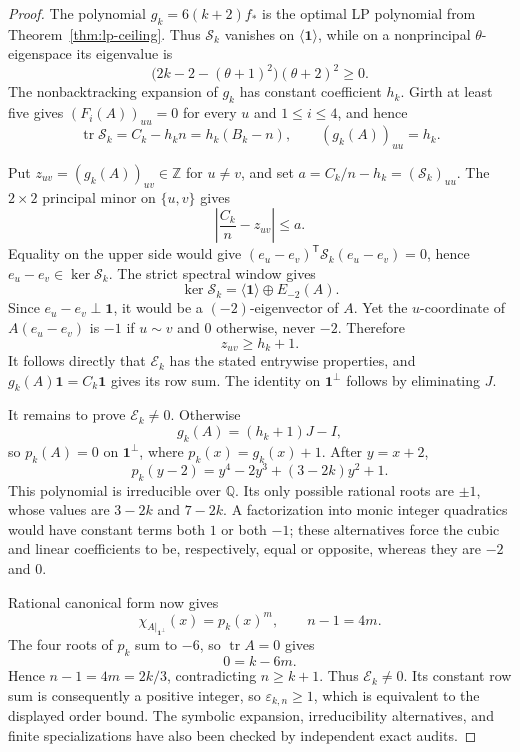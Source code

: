 \documentclass[a4paper,10pt,reqno]{amsart}
\theoremstyle{plain}
\theoremstyle{definition}
\theoremstyle{remark}
\newcommand{\one}{\mathbf 1}
\newcommand{\tr}{\operatorname{tr}}
\begin{document}
\begin{proof}
The polynomial \(g_k=6(k+2)f_*\) is the optimal LP polynomial from
Theorem~\ref{thm:lp-ceiling}.  Thus \(\mathcal S_k\) vanishes on
\(\langle\one\rangle\), while on a nonprincipal \(\theta\)-eigenspace its
eigenvalue is
\[
 \bigl(2k-2-(\theta+1)^2\bigr)(\theta+2)^2\ge0.
\]
The nonbacktracking expansion of \(g_k\) has constant coefficient \(h_k\).
Girth at least five gives
\((F_i(A))_{uu}=0\) for every \(u\) and \(1\le i\le4\), and hence
\[
 \tr\mathcal S_k=C_k-h_kn=h_k(B_k-n),
 \qquad (g_k(A))_{uu}=h_k.
\]

Put \(z_{uv}=(g_k(A))_{uv}\in\mathbb Z\) for \(u\ne v\), and set
\(a=C_k/n-h_k=(\mathcal S_k)_{uu}\).  The \(2\times2\) principal minor on
\(\{u,v\}\) gives
\[
 \left|\frac{C_k}{n}-z_{uv}\right|\le a.
\]
Equality on the upper side would give
\((e_u-e_v)^{\mathsf T}\mathcal S_k(e_u-e_v)=0\), hence
\(e_u-e_v\in\ker\mathcal S_k\).  The strict spectral window gives
\[
 \ker\mathcal S_k=\langle\one\rangle\oplus E_{-2}(A).
\]
Since \(e_u-e_v\perp\one\), it would be a \((-2)\)-eigenvector of \(A\).
Yet the \(u\)-coordinate of \(A(e_u-e_v)\) is \(-1\) if \(u\sim v\) and
\(0\) otherwise, never \(-2\).  Therefore
\[
 z_{uv}\ge h_k+1.
\]
It follows directly that \(\mathcal E_k\) has the stated entrywise properties,
and \(g_k(A)\one=C_k\one\) gives its row sum.  The identity on
\(\one^\perp\) follows by eliminating \(J\).

It remains to prove \(\mathcal E_k\ne0\).  Otherwise
\[
 g_k(A)=(h_k+1)J-I,
\]
so \(p_k(A)=0\) on \(\one^\perp\), where \(p_k(x)=g_k(x)+1\).  After
\(y=x+2\),
\[
 p_k(y-2)=y^4-2y^3+(3-2k)y^2+1.
\]
This polynomial is irreducible over \(\mathbb Q\).  Its only possible rational
roots are \(\pm1\), whose values are \(3-2k\) and \(7-2k\).  A factorization
into monic integer quadratics would have constant terms both \(1\) or both
\(-1\); these alternatives force the cubic and linear coefficients to be,
respectively, equal or opposite, whereas they are \(-2\) and \(0\).

Rational canonical form now gives
\[
 \chi_{A|_{\one^\perp}}(x)=p_k(x)^m,\qquad n-1=4m.
\]
The four roots of \(p_k\) sum to \(-6\), so \(\tr A=0\) gives
\[
 0=k-6m.
\]
Hence \(n-1=4m=2k/3\), contradicting \(n\ge k+1\).  Thus
\(\mathcal E_k\ne0\).  Its constant row sum is consequently a positive
integer, so \(\varepsilon_{k,n}\ge1\), which is equivalent to the displayed
order bound.  The symbolic expansion, irreducibility alternatives, and finite
specializations have also been checked by independent exact audits.
\end{proof}
\end{document}

